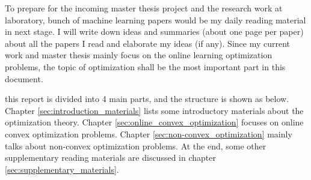 To prepare for the incoming master thesis project and the research work at laboratory, bunch of machine learning papers would be my daily reading material in next stage. 
I will write down ideas and summaries (about one page per paper) about all the papers I read and elaborate my ideas (if any). 
Since my current work and master thesis mainly focus on the online learning optimization problems, the topic of optimization shall be the most important part in this document.

this report is divided into 4 main parts, and the structure is shown as below. 
Chapter \ref{sec:introduction_materials} lists some introductory materials about the optimization theory.
Chapter \ref{sec:online_convex_optimization} focuses on online convex optimization problems. 
Chapter \ref{sec:non-convex_optimization} mainly talks about non-convex optimization problems. 
At the end, some other supplementary reading materials are discussed in chapter \ref{sec:supplementary_materials}.
